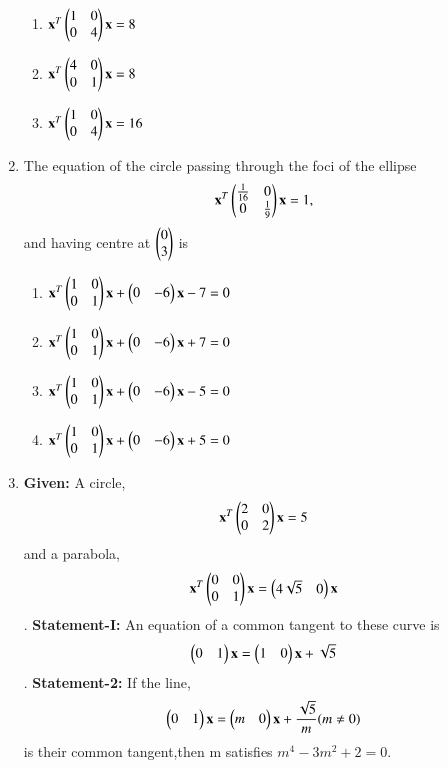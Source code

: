 \documentclass[journal,12pt,twocolumn]{IEEEtran}
\begin{document}
\begin{enumerate}[label=\arabic*]
\begin{enumerate}
    \item $\mathbf{x}^T\begin{pmatrix}1&0\\0&4\end{pmatrix}\mathbf{x}=8$ 
    \item $\mathbf{x}^T\begin{pmatrix}4&0\\0&1\end{pmatrix}\mathbf{x}=8$
    \item $\mathbf{x}^T\begin{pmatrix}1&0\\0&4\end{pmatrix}\mathbf{x}=16$ 
    \end{enumerate}
    \item The equation of the circle passing through the foci of the ellipse 
    \begin{align}
    \mathbf{x}^T\begin{pmatrix}\frac{1}{16}&0\\0&\frac{1}{9}\end{pmatrix}\mathbf{x}=1,
    \end{align} and having centre at $\begin{pmatrix}0\\3\end{pmatrix}$ is 
    \begin{enumerate}
    \item $\mathbf{x}^T\begin{pmatrix}1&0\\0&1\end{pmatrix}\mathbf{x}+\begin{pmatrix}0&-6\end{pmatrix}\mathbf{x}-7=0$
    \item $\mathbf{x}^T\begin{pmatrix}1&0\\0&1\end{pmatrix}\mathbf{x}+\begin{pmatrix}0&-6\end{pmatrix}\mathbf{x}+7=0$
    \item $\mathbf{x}^T\begin{pmatrix}1&0\\0&1\end{pmatrix}\mathbf{x}+\begin{pmatrix}0&-6\end{pmatrix}\mathbf{x}-5=0$
    \item $\mathbf{x}^T\begin{pmatrix}1&0\\0&1\end{pmatrix}\mathbf{x}+\begin{pmatrix}0&-6\end{pmatrix}\mathbf{x}+5=0$
    \end{enumerate}
    \item \textbf{Given:} A circle,
    \begin{align}
    \mathbf{x}^T\begin{pmatrix}2&0\\0&2\end{pmatrix}\mathbf{x}=5
    \end{align} and a parabola,
    \begin{align}
    \mathbf{x}^T\begin{pmatrix}0&0\\0&1\end{pmatrix}\mathbf{x}=\begin{pmatrix}4\sqrt{5}&0\end{pmatrix}\mathbf{x}
    \end{align}.
    \textbf{Statement-I:} An equation of a common tangent to these curve is 
    \begin{align}
    \begin{pmatrix}0&1\end{pmatrix}\mathbf{x}=\begin{pmatrix}1&0\end{pmatrix}\mathbf{x}+\sqrt{5}
    \end{align}.
    \textbf{Statement-2:} If the line,
    \begin{align}
    \begin{pmatrix}0&1\end{pmatrix}\mathbf{x}=\begin{pmatrix}m&0\end{pmatrix}\mathbf{x}+\frac{\sqrt{5}}{m}(m\neq0)
    \end{align}is their common tangent,then m satisfies $m^4-3m^2+2=0$.

\end{enumerate}
\end{document}
